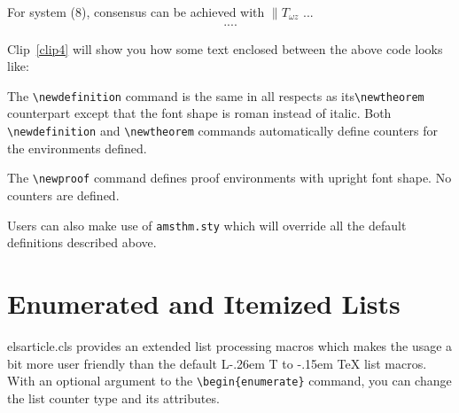 \documentclass[a4paper,12pt]{article}
\makeatletter
\def\bs{\expandafter\@gobble\string\\}
\def\file#1{\textsf{#1}\xspace}
\DeclareRobustCommand{\LaTeX}{L\kern-.26em%
        {\sbox\z@ T%
         \vbox to\ht\z@{\hbox{\check@mathfonts
           \fontsize\sf@size\z@
           \math@fontsfalse\selectfont
          A\,}%
         \vss}%
        }%
     \kern-.15em%
    \TeX}
\makeatother
\begin{document}
\begin{vquote}
  \begin{thm} 
   For system (8), consensus can be achieved with $\|T_{\omega z}$
   ...
     \begin{eqnarray}\label{10}
     ....
     \end{eqnarray}
  \end{thm}
\end{vquote}  

Clip~\ref{clip4} will show you how some text enclosed between the
above code looks like:

\vspace*{6pt}
\def\rulecolor{blue!70}
\src{{\ttfamily\color{verbcolor}\bs newtheorem}}
\def\rulecolor{orange}

The \verb+\newdefinition+ command is the same in
all respects as its\linebreak \verb+\newtheorem+ counterpart except that
the font shape is roman instead of italic.  Both
\verb+\newdefinition+ and \verb+\newtheorem+ commands
automatically define counters for the environments defined.

\vspace*{12pt}
\def\rulecolor{blue!70}
\src{{\ttfamily\color{verbcolor}\bs newdefinition}}
\def\rulecolor{orange}

The \verb+\newproof+ command defines proof environments with
upright font shape.  No counters are defined. 

\vspace*{6pt}
\def\rulecolor{blue!70}
\src{{\ttfamily\color{verbcolor}\bs newproof}}
\def\rulecolor{orange}

Users can also make use of \verb+amsthm.sty+ which will override
all the default definitions described above.

\section[Enumerated ...]{Enumerated and Itemized Lists}
\file{elsarticle.cls} provides an extended list processing macros
which makes the usage a bit more user friendly than the default
\LaTeX{} list macros.   With an optional argument to the
\verb+\begin{enumerate}+ command, you can change the list counter
type and its attributes.
\end{document}
